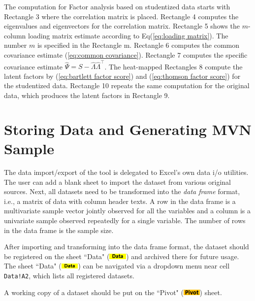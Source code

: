 \documentclass[article]{jss}
\numberwithin{equation}{subsection}
\newcommand{\shtData}{``Data" (\includegraphics[height=8pt, keepaspectratio=true]{DataSheetTab_png}) }
\newcommand{\shtPivot}{``Pivot" (\includegraphics[height=8pt, keepaspectratio=true]{PivotSheetTab_png}) }
\begin{document}
        The computation for Factor analysis based on studentized data starts with Rectangle 3 where the correlation matrix is placed. Rectangle 4 computes the eigenvalues and eigenvectors for the correlation matrix. Rectangle 5 shows the $m$-column loading matrix estimate according to Eq(\ref{eq:loading matrix}). The number $m$ is specified in the Rectangle m. Rectangle 6 computes the common covariance estimate (\ref{eq:common covariance}). Rectangle 7 computes the specific covariance estimate $\hat{\Psi} = S-\hat{\Lambda}\hat{\Lambda}^\intercal$. The heat-mapped Rectangles 8 compute the latent factors by (\ref{eq:bartlett factor score}) and (\ref{eq:thomson factor score}) for the studentized data. Rectangle 10 repeats the same computation for the original data, which produces the latent factors in Rectangle 9.
        
        \section[data]{Storing Data and Generating MVN Sample}
        The data import/export of the tool is delegated to Excel's own data i/o utilities. The user can add a blank sheet to import the dataset from various original sources. Next, all datasets need to be transformed into the \textit{data frame} format, i.e., a matrix of data with column header texts. A row in the data frame is a multivariate sample vector jointly observed for all the variables and a column is a univariate sample observed repeatedly for a single variable. The number of rows in the data frame is the sample size.
        
        After importing and transforming into the data frame format, the dataset should be registered on the sheet \shtData and archived there for future usage. The sheet \shtData can be navigated via a dropdown menu near cell \texttt{Data!A2}, which lists all registered datasets. 
        
        A working copy of a dataset should be put on the \shtPivot sheet.
        
\end{document}
